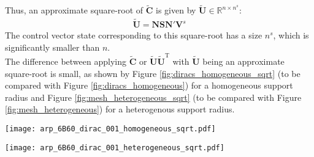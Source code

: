 \documentclass[12pt]{scrartcl}
\begin{document}
Thus, an approximate square-root of $\widetilde{\mathbf{C}}$ is given by $\widetilde{\mathbf{U}} \in \mathbb{R}^{n \times n^s}$:
\begin{align}
\widetilde{\mathbf{U}} = \mathbf{N} \mathbf{S} \mathbf{N}' \mathbf{V}^s
\end{align}
The control vector state corresponding to this square-root has a size $n^s$, which is significantly smaller than $n$.\\
$  $\\
The difference between applying $\widetilde{\mathbf{C}}$ or $\widetilde{\mathbf{U}} \widetilde{\mathbf{U}}^\textrm{T}$ with $\widetilde{\mathbf{U}}$ being an approximate square-root is small, as shown by Figure \ref{fig:diracs_homogeneous_sqrt} (to be compared with Figure \ref{fig:diracs_homogeneous}) for a homogeneous support radius and Figure \ref{fig:mesh_heterogeneous_sqrt} (to be compared with Figure \ref{fig:mesh_heterogeneous}) for a heterogenous support radius.

\begin{center}
\texttt{[image: arp\_6B60\_dirac\_001\_homogeneous\_sqrt.pdf]}
\end{center}
\begin{center}
\texttt{[image: arp\_6B60\_dirac\_001\_heterogeneous\_sqrt.pdf]}
\end{center}
\end{document}
